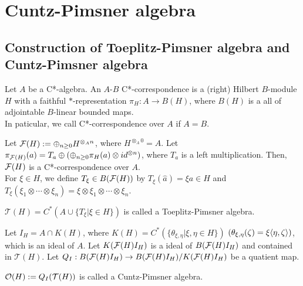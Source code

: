 \section{Cuntz-Pimsner algebra}

\subsection{Construction of Toeplitz-Pimsner algebra and Cuntz-Pimsner algebra}

\begin{definition}
  Let $A$ be a C*-algebra.
  An $A$-$B$ C*-correspondence is a (right) Hilbert $B$-module $H$ with a faithful $*$-representation $\pi_H:A \rightarrow B(H)$,
  where $B(H)$ is a all of adjointable $B$-linear bounded maps.\\
  In paticular, we call C*-correspondence over $A$ if $A=B$.
\end{definition}

Let $\mathcal{F}(H) := \oplus_{n\geq 0}H^{{\otimes}_A n}$, where $H^{{\otimes}_A 0}=A$.
Let $\pi_{\mathcal{F}(H)}(a) = T_a \oplus (\oplus_{n\geq0}\pi_H(a)\otimes id^{\otimes n})$, where $T_a$ is a left multiplication.
Then, $\mathcal{F}(H)$ is a C*-correspondence over $A$.\\
For $\xi \in H$, we define $T_\xi \in B(\mathcal{F}(H))$ by
$T_\xi(\hat{a})=\xi a \in H$ and $T_\xi (\xi_1\otimes \cdots \otimes \xi_n) = \xi \otimes \xi_1 \otimes \cdots \otimes \xi_n$.

\begin{definition}
  $\mathcal{T}(H) = C^*(A \cup \{T_\xi|\xi \in H\})$ is called a Toeplitz-Pimsner algebra.
\end{definition}

Let $I_H = A \cap K(H)$, where $K(H) = C^*(\{\theta_{\xi,\eta}|\xi, \eta \in H\})$ $(\theta_{\xi,\eta}(\zeta) = \xi \langle\eta,\zeta\rangle)$, which is  an ideal of $A$.
Let $K(\mathcal{F}(H)I_H)$ is a ideal of $B(\mathcal{F}(H)I_H)$ and contained in $\mathcal{T}(H)$.
Let $Q_I:B(\mathcal{F}(H)I_H)\rightarrow B(\mathcal{F}(H)I_H)/K(\mathcal{F}(H)I_H)$ be a quatient map.

\begin{definition}
  $\mathcal{O}(H) := Q_I(\mathcal{T}(H))$ is called a Cuntz-Pimsner algebra.
\end{definition}

